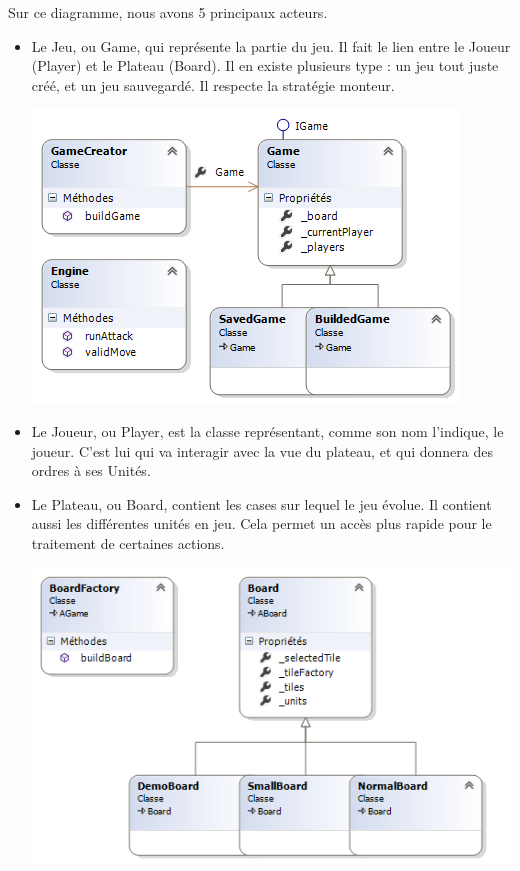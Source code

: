 Sur ce diagramme, nous avons 5 principaux acteurs.\\
\begin{itemize}
  \item Le Jeu, ou Game, qui représente la partie du jeu. Il fait le lien entre le Joueur (Player) et le Plateau (Board). Il en existe plusieurs type : un jeu tout juste créé, et un jeu sauvegardé. Il respecte la stratégie monteur.
	
	\includegraphics[width=\textwidth]{img/cd_game.png}
	
  \item Le Joueur, ou Player, est la classe représentant, comme son nom l'indique, le joueur. C'est lui qui va interagir avec la vue du plateau, et qui donnera des ordres à ses Unités.
		
  \item Le Plateau, ou Board, contient les cases sur lequel le jeu évolue. Il contient aussi les différentes unités en jeu. Cela permet un accès plus rapide pour le traitement de certaines actions.
	
	\includegraphics[width=\textwidth]{img/cd_board.png}
	

\end{itemize}
